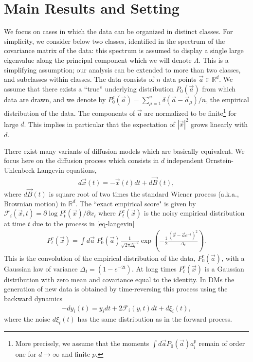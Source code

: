 \documentclass[10pt,twocolumn]{article}
\newcommand{\cF}{\mathcal{F}}
\newcommand{\vx}{\vec x}
\newcommand{\va}{\vec a}
\begin{document}
\section*{Main Results and Setting}

We focus on cases in which the data can be organized in distinct classes. For simplicity, we consider below two classes,  identified in the spectrum of the covariance matrix of the data: this spectrum is assumed to display a single large eigenvalue along the principal component which we will denote $\Lambda$. This is a simplifying assumption; our analysis can be extended to more than two classes, and subclasses within classes. The data consists of $n$ data points 
$\vec a \in \mathbb{R}^d$. We assume that there exists a ``true'' underlying distribution $P_0(\va)$ from which data are drawn, and we denote by $P_0^e(\va)=\sum_{\mu=1}^n\delta(\va -\va_\mu)/n$, the empirical distribution of the data. 
The components of $\va$ are normalized to be finite\footnote{More precisely, we assume that the moments $\int d\vec a P_0(\vec a) a_i^p$ remain of order one for $d\to\infty$ and finite $p$.} for large $d$. This implies in particular that the expectation of $|\vec x|^2$ grows linearly with $d$.

There exist many variants of diffusion models which are basically equivalent. We focus here on the diffusion process which consists in $d$ independent Ornstein-Uhlenbeck Langevin equations,
\begin{align}\label{eq-langevin}
d\vx(t)=-\vx(t)dt+d\vec B(t),
\end{align}
where $d\vec B(t)$ is square root of two times the standard Wiener process (a.k.a., Brownian motion) in $\mathbb{R}^d$.
The ``exact empirical score" is given by $\cF_i(\vx,t)=\partial \log P_t^e(\vx)/\partial x_i$ where $P_t^e(\vx)$ is the noisy empirical distribution at time $t$ due to the process in \eqref{eq-langevin}
\begin{align}
P_t^e(\vx)=\int d\va \; P_0^e(\va) \frac{1}{\sqrt{2\pi
  \Delta_t}^d}\exp\left(-\frac{1}{2} \frac{(\vx-\va
  e^{-t})^2}{\Delta_t}\right).
\label{Pt_gen}
\end{align}
This is the convolution of the empirical distribution of the data, $P_0^e(\va)$, with a Gaussian law of variance
$\Delta_t=(1-e^{-2t})$. At long times $P_t^e(\vx)$ is a Gaussian distribution with zero mean and covariance equal to the identity. In DMs the generation of new data is obtained by time-reversing this process using the backward dynamics
\begin{align}\label{eq:tr}
-dy_i(t)=y_idt+2 \cF_i(y,t)dt +d\xi_i(t),
\end{align}
where the noise $d\xi_i(t)$ has the same distribution as in the forward
process.
\end{document}
